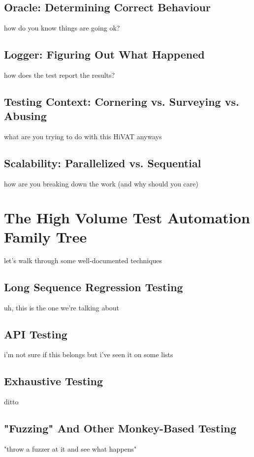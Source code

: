 \subsection{Oracle: Determining Correct Behaviour}
how do you know things are going ok?

\subsection{Logger: Figuring Out What Happened}
how does the test report the results?

\subsection{Testing Context: Cornering vs. Surveying vs. Abusing}
what are you trying to do with this HiVAT anyways

\subsection{Scalability: Parallelized vs. Sequential}
how are you breaking down the work (and why should you care)

\section{The High Volume Test Automation Family Tree}
let's walk through some well-documented techniques

\subsection{Long Sequence Regression Testing}
uh, this is the one we're talking about \citep{lee1996principles}

\subsection{API Testing}
i'm not sure if this belongs but i've seen it on some lists

\subsection{Exhaustive Testing}
ditto

\subsection{"Fuzzing" And Other Monkey-Based Testing}
 "throw a fuzzer at it and see what happens"

